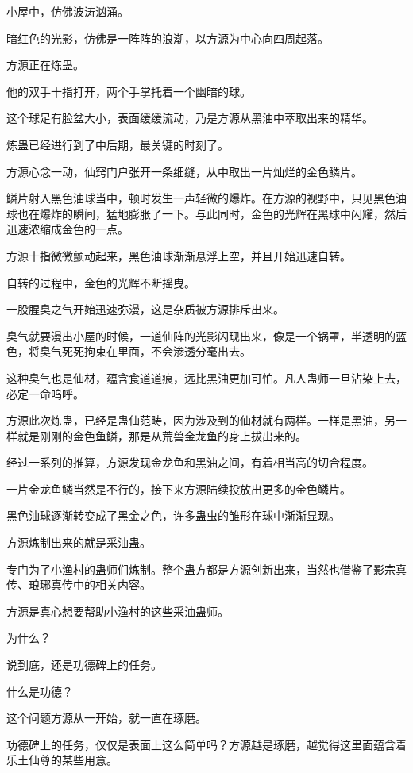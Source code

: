 
\begin{this_body}

小屋中，仿佛波涛汹涌。

暗红色的光影，仿佛是一阵阵的浪潮，以方源为中心向四周起落。

方源正在炼蛊。

他的双手十指打开，两个手掌托着一个幽暗的球。

这个球足有脸盆大小，表面缓缓流动，乃是方源从黑油中萃取出来的精华。

炼蛊已经进行到了中后期，最关键的时刻了。

方源心念一动，仙窍门户张开一条细缝，从中取出一片灿烂的金色鳞片。

鳞片射入黑色油球当中，顿时发生一声轻微的爆炸。在方源的视野中，只见黑色油球也在爆炸的瞬间，猛地膨胀了一下。与此同时，金色的光辉在黑球中闪耀，然后迅速浓缩成金色的一点。

方源十指微微颤动起来，黑色油球渐渐悬浮上空，并且开始迅速自转。

自转的过程中，金色的光辉不断摇曳。

一股腥臭之气开始迅速弥漫，这是杂质被方源排斥出来。

臭气就要漫出小屋的时候，一道仙阵的光影闪现出来，像是一个锅罩，半透明的蓝色，将臭气死死拘束在里面，不会渗透分毫出去。

这种臭气也是仙材，蕴含食道道痕，远比黑油更加可怕。凡人蛊师一旦沾染上去，必定一命呜呼。

方源此次炼蛊，已经是蛊仙范畴，因为涉及到的仙材就有两样。一样是黑油，另一样就是刚刚的金色鱼鳞，那是从荒兽金龙鱼的身上拔出来的。

经过一系列的推算，方源发现金龙鱼和黑油之间，有着相当高的切合程度。

一片金龙鱼鳞当然是不行的，接下来方源陆续投放出更多的金色鳞片。

黑色油球逐渐转变成了黑金之色，许多蛊虫的雏形在球中渐渐显现。

方源炼制出来的就是采油蛊。

专门为了小渔村的蛊师们炼制。整个蛊方都是方源创新出来，当然也借鉴了影宗真传、琅琊真传中的相关内容。

方源是真心想要帮助小渔村的这些采油蛊师。

为什么？

说到底，还是功德碑上的任务。

什么是功德？

这个问题方源从一开始，就一直在琢磨。

功德碑上的任务，仅仅是表面上这么简单吗？方源越是琢磨，越觉得这里面蕴含着乐土仙尊的某些用意。


\end{this_body}
